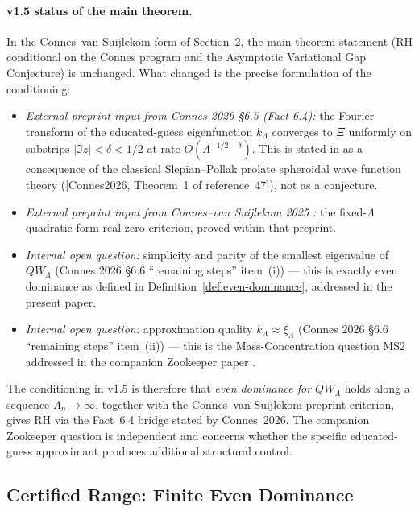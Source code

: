 \documentclass[11pt,a4paper]{article}
\theoremstyle{remark}
\theoremstyle{plain}
\begin{document}
\paragraph{v1.5 status of the main theorem.}  In the Connes--van
Suijlekom form of Section~2, the main theorem statement (RH
conditional on the Connes program and the Asymptotic Variational Gap
Conjecture) is unchanged.  What changed is the precise formulation of
the conditioning:
\begin{itemize}[leftmargin=*]
  \item \emph{External preprint input from Connes 2026 §6.5
    (Fact 6.4):} the Fourier transform of the educated-guess
    eigenfunction $k_\Lambda$ converges to $\Xi$ uniformly on substrips
    $|\Im z|<\delta<1/2$ at rate $O(\Lambda^{-1/2-\delta})$.  This is
    stated in \cite{Connes2026} as a consequence of the
    classical Slepian--Pollak prolate spheroidal wave function theory
    ([Connes2026, Theorem~1 of reference~47]), not as a conjecture.
  \item \emph{External preprint input from Connes--van Suijlekom 2025
    \cite{ConnesvS2025}:} the fixed-$\Lambda$ quadratic-form
    real-zero criterion, proved within that preprint.
  \item \emph{Internal open question:} simplicity and parity of the
    smallest eigenvalue of $QW_\Lambda$ (Connes 2026 §6.6 ``remaining
    steps'' item~(i)) --- this is exactly even dominance as defined in
    Definition~\ref{def:even-dominance}, addressed in the present paper.
  \item \emph{Internal open question:} approximation quality
    $k_\Lambda\approx\xi_\Lambda$ (Connes 2026 §6.6 ``remaining steps''
    item~(ii)) --- this is the Mass-Concentration question MS2
    addressed in the companion Zookeeper paper \cite{GeigerZookeeper2026}.
\end{itemize}
The conditioning in v1.5 is therefore that
\emph{even dominance for $QW_\Lambda$} holds along a sequence
$\Lambda_n\to\infty$, together with the Connes--van Suijlekom
preprint criterion, gives RH via the Fact~6.4 bridge stated by
Connes~2026.  The companion
Zookeeper question is independent and concerns whether the specific
educated-guess approximant produces additional structural control.

\subsection{Certified Range: Finite Even Dominance}
\end{document}
